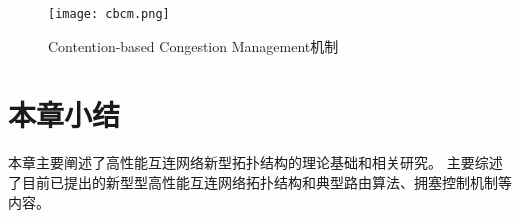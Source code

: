 \begin{figure}[htp]
  \centering
    \texttt{[image: cbcm.png]}
    \caption{Contention-based Congestion Management机制}
       \label{cbcm}
\end{figure}

\section{本章小结}
本章主要阐述了高性能互连网络新型拓扑结构的理论基础和相关研究。
主要综述了目前已提出的新型型高性能互连网络拓扑结构和典型路由算法、拥塞控制机制等内容。

